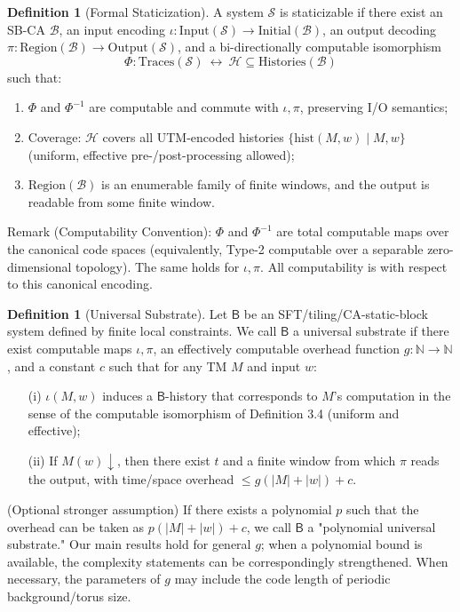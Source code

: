 \documentclass[12pt]{article}
\theoremstyle{plain}
\theoremstyle{definition}
\newtheorem{definition}[theorem]{Definition}
\begin{document}
\begin{definition}[Formal Staticization]
A system $\mathcal{S}$ is staticizable if there exist an SB-CA $\mathcal{B}$, an input encoding $\iota: \mathrm{Input}(\mathcal{S})\to \mathrm{Initial}(\mathcal{B})$, an output decoding $\pi: \mathrm{Region}(\mathcal{B})\to \mathrm{Output}(\mathcal{S})$, and a bi-directionally computable isomorphism
\[
\Phi: \mathrm{Traces}(\mathcal{S})\ \leftrightarrow\ \mathcal{H}\subseteq\mathrm{Histories}(\mathcal{B})
\]
such that:
\begin{enumerate}
\item $\Phi$ and $\Phi^{-1}$ are computable and commute with $\iota,\pi$, preserving I/O semantics;
\item Coverage: $\mathcal{H}$ covers all UTM-encoded histories $\{\mathrm{hist}(M,w)\mid M,w\}$ (uniform, effective pre-/post-processing allowed);
\item $\mathrm{Region}(\mathcal{B})$ is an enumerable family of finite windows, and the output is readable from some finite window.
\end{enumerate}

Remark (Computability Convention): $\Phi$ and $\Phi^{-1}$ are total computable maps over the canonical code spaces (equivalently, Type-2 computable over a separable zero-dimensional topology). The same holds for $\iota,\pi$. All computability is with respect to this canonical encoding.
\end{definition}

\begin{definition}[Universal Substrate]
Let $\mathsf{B}$ be an SFT/tiling/CA-static-block system defined by finite local constraints. We call $\mathsf{B}$ a universal substrate if there exist computable maps $\iota,\pi$, an effectively computable overhead function $g:\mathbb{N}\to\mathbb{N}$, and a constant $c$ such that for any TM $M$ and input $w$:

\begin{enumerate}
\item[(i)] $\iota(M,w)$ induces a $\mathsf{B}$-history that corresponds to $M$'s computation in the sense of the computable isomorphism of Definition 3.4 (uniform and effective);

\item[(ii)] If $M(w)\downarrow$, then there exist $t$ and a finite window from which $\pi$ reads the output, with time/space overhead $\le g(|M|+|w|)+c$.
\end{enumerate}

(Optional stronger assumption) If there exists a polynomial $p$ such that the overhead can be taken as $p(|M|+|w|)+c$, we call $\mathsf{B}$ a "polynomial universal substrate." Our main results hold for general $g$; when a polynomial bound is available, the complexity statements can be correspondingly strengthened. When necessary, the parameters of $g$ may include the code length of periodic background/torus size.
\end{definition}
\end{document}
